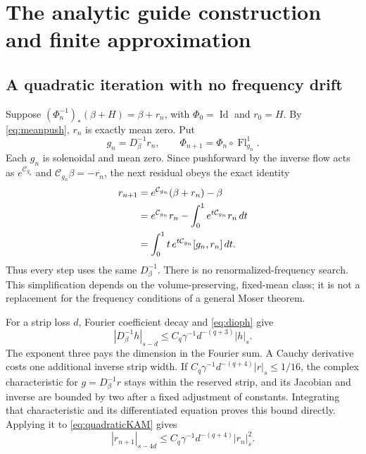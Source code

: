 \documentclass[11pt,a4paper]{amsart}
\theoremstyle{definition}
\theoremstyle{remark}
\numberwithin{equation}{section}
\newcommand{\Ccal}{\mathcal C}
\newcommand{\Flow}{\operatorname{Fl}}
\newcommand{\push}[1]{(#1)_*}
\DeclareMathOperator{\Id}{Id}
\begin{document}
\section{The analytic guide construction and finite approximation}\label{app:analytic}

\subsection{A quadratic iteration with no frequency drift}
Suppose $\push{\Phi_n^{-1}}(\beta+H)=\beta+r_n$, with $\Phi_0=\Id$ and $r_0=H$. By \eqref{eq:meanpush}, $r_n$ is exactly mean zero. Put
\[
 g_n=D_\beta^{-1}r_n,\qquad
 \Phi_{n+1}=\Phi_n\circ\Flow_{g_n}^1.
\]
Each $g_n$ is solenoidal and mean zero. Since pushforward by the inverse flow acts as $e^{\Ccal_{g_n}}$ and $\Ccal_{g_n}\beta=-r_n$, the next residual obeys the exact identity
\begin{align}
 r_{n+1}
 &=e^{\Ccal_{g_n}}(\beta+r_n)-\beta\notag\\
 &=e^{\Ccal_{g_n}}r_n-\int_0^1e^{t\Ccal_{g_n}}r_n\,dt\notag\\
 &=\int_0^1t\,e^{t\Ccal_{g_n}}[g_n,r_n]\,dt.\label{eq:quadraticKAM}
\end{align}
Thus every step uses the same $D_\beta^{-1}$. There is no renormalized-frequency search. This simplification depends on the volume-preserving, fixed-mean class; it is not a replacement for the frequency conditions of a general Moser theorem.

For a strip loss $d$, Fourier coefficient decay and \eqref{eq:dioph} give
\begin{equation}\label{eq:homologicalstrip}
 |D_\beta^{-1}h|_{s-d}
 \le C_q\gamma^{-1}d^{-(q+3)}|h|_s.
\end{equation}
The exponent three pays the dimension in the Fourier sum. A Cauchy derivative costs one additional inverse strip width. If
$C_q\gamma^{-1}d^{-(q+4)}|r|_s\le1/16$, the complex characteristic for $g=D_\beta^{-1}r$ stays within the reserved strip, and its Jacobian and inverse are bounded by two after a fixed adjustment of constants. Integrating that characteristic and its differentiated equation proves this bound directly. Applying it to \eqref{eq:quadraticKAM} gives
\begin{equation}\label{eq:KAMrecurrence}
 |r_{n+1}|_{s-4d}
 \le C_q\gamma^{-1}d^{-(q+4)}|r_n|_s^2.
\end{equation}
\end{document}
